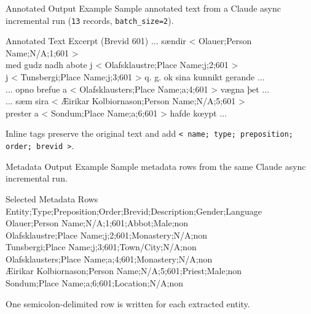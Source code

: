 \documentclass[
        11pt,
        compress,
        xcolor={dvipsnames}
    ]{beamer}
\begin{document}
\begin{frame}{Annotated Output Example}
  \scriptsize
  Sample annotated text from a Claude async incremental run
  (\texttt{13} records, \texttt{batch\_size=2}).
  \vspace{0.3em}
  \begin{block}{Annotated Text Excerpt (Brevid 601)}
    \ttfamily\scriptsize
    ... sændir \textless{} Olauer;Person Name;N/A;1;601 \textgreater{}\\
    med gudz nadh abote j \textless{} Olafsklaustre;Place Name;j;2;601 \textgreater{}\\
    j \textless{} Tunsbergi;Place Name;j;3;601 \textgreater{} q. g. ok sina kunnikt gerande ...\\[0.3em]
    ... opno brefue a \textless{} Olafsklausters;Place Name;a;4;601 \textgreater{} vægna þet ...\\
    ... sæm sira \textless{} Æirikar Kolbiornason;Person Name;N/A;5;601 \textgreater{}\\
    prester a \textless{} Sondum;Place Name;a;6;601 \textgreater{} hafde kœypt ...
  \end{block}
  \scriptsize
  Inline tags preserve the original text and add
  \texttt{\textless{} name; type; preposition; order; brevid \textgreater{}}.
\end{frame}

\begin{frame}[shrink=2]{Metadata Output Example}
  \scriptsize
  Sample metadata rows from the same Claude async incremental run.
  \vspace{0.3em}
  \begin{block}{Selected Metadata Rows}
    \ttfamily\scriptsize
    Entity;Type;Preposition;Order;Brevid;Description;Gender;Language\\
    Olauer;Person Name;N/A;1;601;Abbot;Male;non\\
    Olafsklaustre;Place Name;j;2;601;Monastery;N/A;non\\
    Tunsbergi;Place Name;j;3;601;Town/City;N/A;non\\
    Olafsklausters;Place Name;a;4;601;Monastery;N/A;non\\
    Æirikar Kolbiornason;Person Name;N/A;5;601;Priest;Male;non\\
    Sondum;Place Name;a;6;601;Location;N/A;non
  \end{block}
  \scriptsize
  One semicolon-delimited row is written for each extracted entity.
\end{frame}
\end{document}
